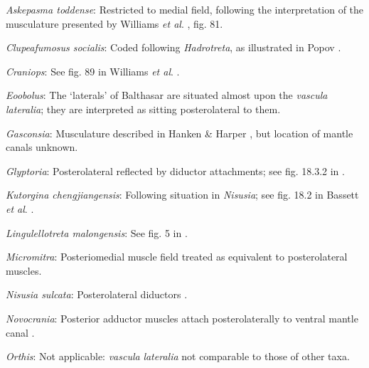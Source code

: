 \documentclass[openany]{book}
\theoremstyle{definition}
\theoremstyle{definition}
\theoremstyle{definition}
\theoremstyle{remark}
\begin{document}
\hypertarget{Askepasma_toddense-coding-77}{}
\emph{Askepasma toddense}: Restricted to medial field, following the
interpretation of the musculature presented by Williams \emph{et al}.
\citeyearpar{Williams2000LinguliformeaCraniiformea}, fig. 81.

\hypertarget{Clupeafumosus_socialis-coding-77}{}
\emph{Clupeafumosus socialis}: Coded following \emph{Hadrotreta}, as
illustrated in Popov \citeyearpar{Popov1992TheCambrian}.

\hypertarget{Craniops-coding-77}{}
\emph{Craniops}: See fig. 89 in Williams \emph{et al}.
\citeyearpar{Williams2000LinguliformeaCraniiformea}.

\hypertarget{Eoobolus-coding-77}{}
\emph{Eoobolus}: The `laterals' of Balthasar \citeyearpar[fig.
5]{Balthasar2009Thebrachiopod} are situated almost upon the
\emph{vascula} \emph{lateralia}; they are interpreted as sitting
posterolateral to them.

\hypertarget{Gasconsia-coding-77}{}
\emph{Gasconsia}: Musculature described in Hanken \& Harper
\citeyearpar{Hanken1985Thetaxonomy}, but location of mantle canals
unknown.

\hypertarget{Glyptoria-coding-77}{}
\emph{Glyptoria}: Posterolateral reflected by diductor attachments; see
fig. 18.3.2 in \citet{Bassett2001Functionalmorphology}.

\hypertarget{Kutorgina_chengjiangensis-coding-77}{}
\emph{Kutorgina chengjiangensis}: Following situation in \emph{Nisusia};
see fig. 18.2 in Bassett \emph{et al}.
\citeyearpar{Bassett2001Functionalmorphology}.

\hypertarget{Lingulellotreta_malongensis-coding-77}{}
\emph{Lingulellotreta malongensis}: See fig. 5 in
\citet{Holmer1997EarlyCambrian}.

\hypertarget{Micromitra-coding-77}{}
\emph{Micromitra}: Posteriomedial muscle field \citep[text-fig.
6]{Williams1998Thediversity} treated as equivalent to posterolateral
muscles.

\hypertarget{Nisusia_sulcata-coding-77}{}
\emph{Nisusia sulcata}: Posterolateral diductors \citep[fig. 18.2
in][]{Bassett2001Functionalmorphology}.

\hypertarget{Novocrania-coding-77}{}
\emph{Novocrania}: Posterior adductor muscles attach posterolaterally to
ventral mantle canal \citep{Robinson2014Themuscles}.

\hypertarget{Orthis-coding-77}{}
\emph{Orthis}: Not applicable: \emph{vascula} \emph{lateralia} not
comparable to those of other taxa.
\end{document}

